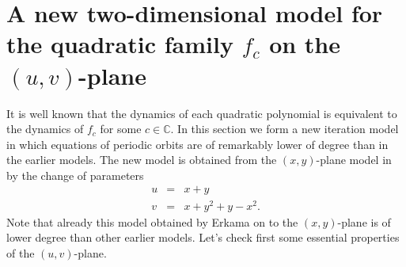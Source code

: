 \documentclass[12pt,a4paper]{amsart}
\numberwithin{equation}{section}
\numberwithin{lause}{section}
\begin{document}
\section{A new two-dimensional model for the quadratic family $f_{c}$ on the $(u,v)$-plane}

It is well known that the dynamics of each quadratic polynomial is equivalent to the dynamics of $f_{c}$ for some $c \in \mathbb{C}$. In this section we form a new iteration model in which equations of periodic orbits are of remarkably lower of degree than in the earlier models. The new model is obtained from the $(x,y)$-plane model in \cite{1} by the change of parameters
\begin{eqnarray*}
u&=&x+y \\
v&=&x+y^2+y-x^2.
\end{eqnarray*}
Note that already this model obtained by Erkama on to the $(x,y)$-plane is of lower degree than other earlier models. Let's check first some essential properties of the $(u,v)$-plane.
\end{document}
